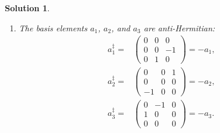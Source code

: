 \documentclass[UTF8,10pt,a4paper]{article}
\theoremstyle{Problem}
\theoremstyle{Solution}
\newtheorem*{sol}{Solution}
\begin{document}
\begin{sol}
\begin{enumerate}
\begin{align}
\begin{matrix}
                0&0&0\\
                0&0&1\\
                0&-1&0
            \end{matrix}\right)\left(\begin{matrix}
                0&1&0\\
                -1&0&0\\
                0&0&0
            \end{matrix}\right)\\
            =&\left(\begin{matrix}
                0&0&1\\
                0&0&0\\
                0&0&0
            \end{matrix}\right)-\left(\begin{matrix}
                0&0&0\\
                0&0&0\\
                1&0&0
            \end{matrix}\right)=\left(\begin{matrix}
                0&0&1\\
                0&0&0\\
                -1&0&0
            \end{matrix}\right)=-a_2.
        \end{align}
        \item[(b)] The basis elements $a_1$, $a_2$, and $a_3$ are anti-Hermitian:
        \begin{align}
            a_1^{\ddagger}=&\left(\begin{matrix}
                0&0&0\\
                0&0&-1\\
                0&1&0
            \end{matrix}\right)=-a_1,\\
            a_2^{\ddagger}=&\left(\begin{matrix}
                0&0&1\\
                0&0&0\\
                -1&0&0
            \end{matrix}\right)=-a_2,\\
            a_3^{\ddagger}=&\left(\begin{matrix}
                0&-1&0\\
                1&0&0\\
                0&0&0
            \end{matrix}\right)=-a_3.
        \end{align}
    \end{enumerate}
\end{sol}
\end{document}
